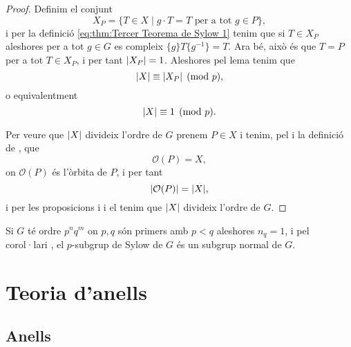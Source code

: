 \documentclass[../../Main.tex]{subfiles}
\begin{document}
\begin{theorem}
\begin{proof}
			Definim el conjunt
			\[X_{P}=\{T\in X\mid g\cdot T=T\text{ per a tot }g\in P\},\]
			i per la definició \eqref{eq:thm:Tercer Teorema de Sylow 1} tenim que si \(T\in X_{P}\) aleshores per a tot \(g\in G\) es compleix \(\{g\}T\{g^{-1}\}=T\). Ara bé, això és que \(T=P\) per a tot \(T\in X_{P}\), i per tant \(\abs{X_{P}}=1\). Aleshores pel lema  tenim que
			\[\abs{X}\equiv\abs{X_{P}}\pmod{p},\]
			o equivalentment
			\[\abs{X}\equiv1\pmod{p}.\]
			
			Per veure que \(\abs{X}\) divideix l'ordre de \(G\) prenem \(P\in X\) i tenim, pel  i la definició de , que
			\[\mathcal{O}(P)=X,\]
			on \(\mathcal{O}(P)\) és l'òrbita de \(P\), i per tant
			\[\abs{\mathcal{O}(P)}=\abs{X},\]
			i per les proposicions  i  i el  tenim que \(\abs{X}\) divideix l'ordre de \(G\).
		\end{proof}
	\end{theorem}
	\begin{corollary}
		Si \(G\) té ordre \(p^{n}q^{m}\) on \(p,q\) són primers amb \(p<q\) aleshores \(n_{q}=1\), i pel corol·lari , el \(p\)-subgrup de Sylow de \(G\) és un subgrup normal de \(G\).
	\end{corollary}
\chapter{Teoria d'anells}
\section{Anells}
\end{document}
